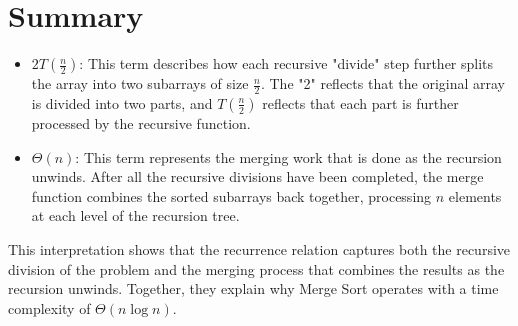 \documentclass{article}
\begin{document}
\section{Summary}

\begin{itemize}
    \item \textbf{\( 2T\left(\frac{n}{2}\right) \)}: This term describes how each recursive "divide" step further splits the array into two subarrays of size \( \frac{n}{2} \). The "2" reflects that the original array is divided into two parts, and \( T\left(\frac{n}{2}\right) \) reflects that each part is further processed by the recursive function.
    
    \item \textbf{\( \Theta(n) \)}: This term represents the merging work that is done as the recursion unwinds. After all the recursive divisions have been completed, the merge function combines the sorted subarrays back together, processing \( n \) elements at each level of the recursion tree.
\end{itemize}

This interpretation shows that the recurrence relation captures both the recursive division of the problem and the merging process that combines the results as the recursion unwinds. Together, they explain why Merge Sort operates with a time complexity of \( \Theta(n \log n) \).
\end{document}
